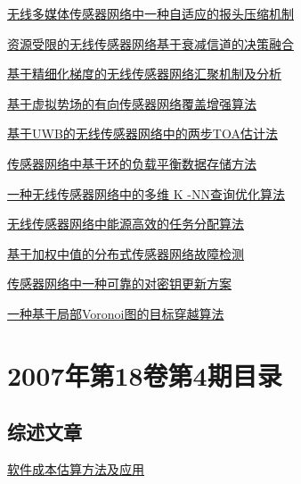 \documentclass[a4paper]{article}
\begin{document}
\href{http://www.jos.org.cn/ch/reader/download_pdf.aspx?file_no=20070505&year_id=2007&quarter_id=5&falg=1}{无线多媒体传感器网络中一种自适应的报头压缩机制}

\href{http://www.jos.org.cn/ch/reader/download_pdf.aspx?file_no=20070506&year_id=2007&quarter_id=5&falg=1}{资源受限的无线传感器网络基于衰减信道的决策融合}

\href{http://www.jos.org.cn/ch/reader/download_pdf.aspx?file_no=20070507&year_id=2007&quarter_id=5&falg=1}{基于精细化梯度的无线传感器网络汇聚机制及分析}

\href{http://www.jos.org.cn/ch/reader/download_pdf.aspx?file_no=20070508&year_id=2007&quarter_id=5&falg=1}{基于虚拟势场的有向传感器网络覆盖增强算法}

\href{http://www.jos.org.cn/ch/reader/download_pdf.aspx?file_no=20070509&year_id=2007&quarter_id=5&falg=1}{基于UWB的无线传感器网络中的两步TOA估计法}

\href{http://www.jos.org.cn/ch/reader/download_pdf.aspx?file_no=20070510&year_id=2007&quarter_id=5&falg=1}{传感器网络中基于环的负载平衡数据存储方法}

\href{http://www.jos.org.cn/ch/reader/download_pdf.aspx?file_no=20070511&year_id=2007&quarter_id=5&falg=1}{一种无线传感器网络中的多维 K -NN查询优化算法}

\href{http://www.jos.org.cn/ch/reader/download_pdf.aspx?file_no=20070512&year_id=2007&quarter_id=5&falg=1}{无线传感器网络中能源高效的任务分配算法}

\href{http://www.jos.org.cn/ch/reader/download_pdf.aspx?file_no=20070513&year_id=2007&quarter_id=5&falg=1}{基于加权中值的分布式传感器网络故障检测}

\href{http://www.jos.org.cn/ch/reader/download_pdf.aspx?file_no=20070515&year_id=2007&quarter_id=5&falg=1}{传感器网络中一种可靠的对密钥更新方案}

\href{http://www.jos.org.cn/ch/reader/download_pdf.aspx?file_no=20070516&year_id=2007&quarter_id=5&falg=1}{一种基于局部Voronoi图的目标穿越算法}


\section{\textbf{2007年第18卷第4期目录}}
\subsection{综述文章}
\href{http://www.jos.org.cn/ch/reader/download_pdf.aspx?file_no=20070401&year_id=2007&quarter_id=4&falg=1}{软件成本估算方法及应用}
\end{document}
